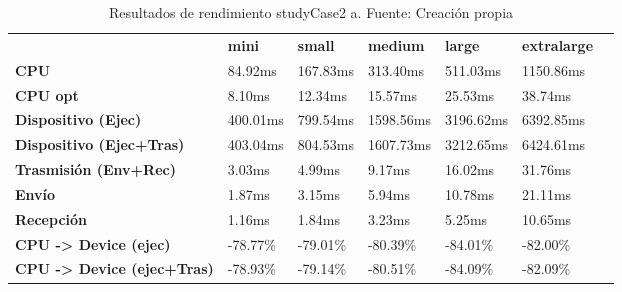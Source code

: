 \begin{table}[H]
    \centering
    \begin{tabular}{lllllll}
    \rowcolor[HTML]{DAE8FC} \ &  \textbf{mini} &  \textbf{small} &  \textbf{medium} &  \textbf{	large} &  \textbf{	extralarge} \\
    \cellcolor[HTML]{DAE8FC} \textbf{CPU} & 84.92ms & 167.83ms & 313.40ms & 	511.03ms & 	1150.86ms \\
    \rowcolor[HTML]{EFEFEF} \cellcolor[HTML]{DAE8FC} \textbf{CPU opt} & 8.10ms & 12.34ms & 15.57ms & 	25.53ms & 	38.74ms \\
    \cellcolor[HTML]{DAE8FC} \textbf{Dispositivo (Ejec)} & 400.01ms & 799.54ms & 1598.56ms & 	3196.62ms & 	6392.85ms \\
    \rowcolor[HTML]{EFEFEF} \cellcolor[HTML]{DAE8FC} \textbf{Dispositivo (Ejec+Tras)} & 403.04ms & 804.53ms & 1607.73ms & 	3212.65ms & 	6424.61ms \\
    \cellcolor[HTML]{DAE8FC} \textbf{Trasmisión (Env+Rec)} & 3.03ms & 4.99ms & 9.17ms & 	16.02ms & 	31.76ms \\
    \rowcolor[HTML]{EFEFEF} \cellcolor[HTML]{DAE8FC} \textbf{Envío} & 1.87ms & 3.15ms & 5.94ms & 	10.78ms & 	21.11ms \\
    \cellcolor[HTML]{DAE8FC} \textbf{Recepción} & 1.16ms & 1.84ms & 3.23ms & 	5.25ms & 	10.65ms \\
    \rowcolor[HTML]{EFEFEF} \cellcolor[HTML]{DAE8FC} \textbf{CPU -> Device (ejec)} & -78.77\% & -79.01\% & -80.39\% & 	-84.01\% & 	-82.00\% \\
    \cellcolor[HTML]{DAE8FC} \textbf{CPU -> Device (ejec+Tras)} & -78.93\% & -79.14\% & -80.51\% & 	-84.09\% & 	-82.09\% \\
    \end{tabular}
    \caption[Resultados de rendimiento studyCase2 a]{{Resultados de rendimiento studyCase2 a. Fuente: Creación propia}}
    \label{table_test_studyCase2_a_hw_performanceResults}
\end{table}
